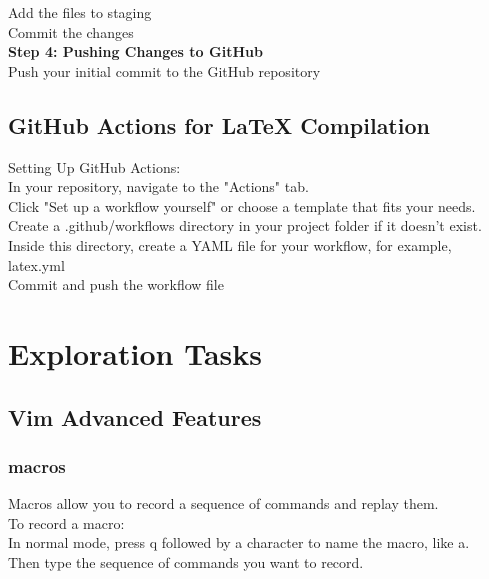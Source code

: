 \documentclass{article}
\begin{document}
Add the files to staging\\

Commit the changes\\

\textbf{Step 4: Pushing Changes to GitHub}\\

Push your initial commit to the GitHub repository\\


\subsection{GitHub Actions for LaTeX Compilation\\}
Setting Up GitHub Actions:\\
In your repository, navigate to the "Actions" tab.\\

Click "Set up a workflow yourself" or choose a template that fits your needs.\\

Create a .github/workflows directory in your project folder if it doesn't exist.\\

Inside this directory, create a YAML file for your workflow, for example, latex.yml\\

Commit and push the workflow file\\

\section{Exploration Tasks}
\subsection{Vim Advanced Features}

\subsubsection{macros}

Macros allow you to record a sequence of commands and replay them.\\

To record a macro:\\

In normal mode, press q followed by a character to name the macro, like a.\\

Then type the sequence of commands you want to record.\\
\end{document}
